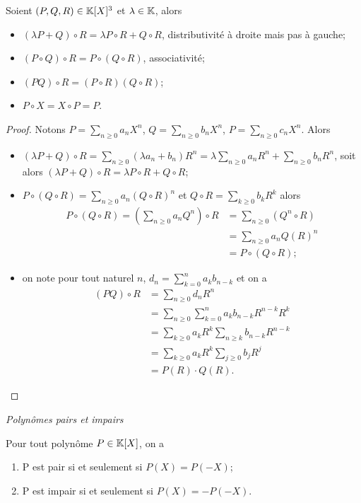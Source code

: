 \begin{prop}
  Soient $(P,Q,R) \in \mathbb{K}[X]^3$ et $\lambda \in \mathbb{K}$, alors
  \begin{itemize}
  \item $(\lambda P+Q)\circ R = \lambda P \circ R +Q \circ R$, distributivité à droite mais pas à gauche;
  \item $(P \circ Q) \circ R = P \circ (Q \circ R)$, associativité;
  \item $(PQ)\circ R = (P \circ R)(Q \circ R)$;
  \item $P \circ X = X \circ P=P$.
  \end{itemize}
\end{prop}
\begin{proof}
  Notons $P=\sum_{n \geq 0} a_n X^n$, $Q=\sum_{n \geq 0} b_n X^n$, $P=\sum_{n \geq 0} c_n X^n$. Alors
  \begin{itemize}
  \item $(\lambda P+Q)\circ R = \sum_{n \geq 0} (\lambda a_n+b_n) R^n = \lambda \sum_{n \geq 0} a_n R^n + \sum_{n \geq 0} b_n R^n$, soit alors $ (\lambda P+Q)\circ R = \lambda P \circ R +Q \circ R$;
  \item $P \circ (Q \circ R) = \sum_{n \geq 0} a_n (Q \circ R)^n$ et $Q \circ R = \sum_{k \geq 0} b_k R^k$ alors
    \begin{align}
      P \circ (Q \circ R) = \left(\sum_{n \geq 0} a_n Q^n \right) \circ R &= \sum_{n \geq 0} (Q^n \circ R) \\
      &= \sum_{n \geq 0} a_n Q(R)^n\\
      &=P \circ (Q \circ R);
    \end{align}
  \item on note pour tout naturel $n$, $d_n=\sum_{k=0}^n a_k b_{n-k}$ et on a
    \begin{align}
      (PQ)\circ R &= \sum_{n \geq 0} d_n R^n \\
      &= \sum_{n \geq 0} \sum_{k=0}^n a_k b_{n-k} R^{n-k}R^k \\
      &= \sum_{k \geq 0} a_k R^k \sum_{n \geq k} b_{n-k} R^{n-k}\\
      &=\sum_{k\geq 0} a_k R^k \sum_{j \geq 0} b_j R^j\\
      &=P(R) \cdot Q(R).
    \end{align}
  \end{itemize}
\end{proof}

\emph{Polynômes pairs et impairs}

\begin{prop}
  Pour tout polynôme $P \in \mathbb{K}[X]$, on a
  \begin{enumerate}
  \item P est pair si et seulement si $P(X)=P(-X)$;
  \item P est impair si et seulement si $P(X)=-P(-X)$.
  \end{enumerate}
\end{prop}

